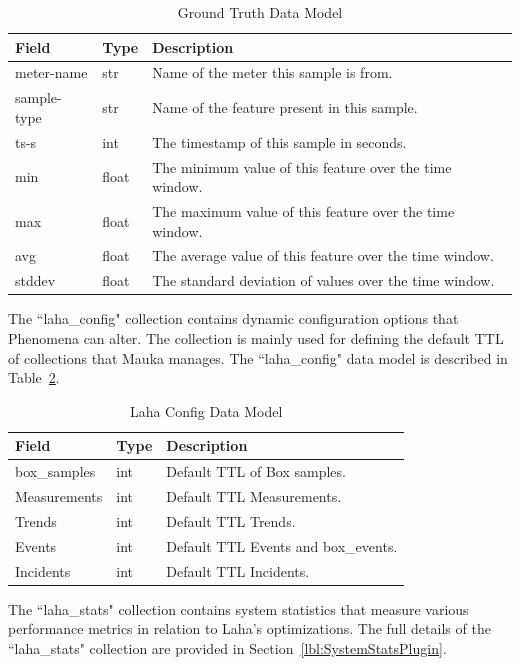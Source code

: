 \begin{table}[H]
	\centering
	\caption{Ground Truth Data Model}
	\begin{tabularx}{\textwidth}{llX}
		\toprule
		\textbf{Field} & \textbf{Type} & \textbf{Description} \\
		\midrule
		meter-name & str & Name of the meter this sample is from. \\
		sample-type & str & Name of the feature present in this sample. \\
		ts-s & int & The timestamp of this sample in seconds. \\
		min & float & The minimum value of this feature over the time window. \\
		max & float & The maximum value of this feature over the time window. \\
		avg & float & The average value of this feature over the time window. \\
		stddev & float & The standard deviation of values over the time window. \\
		\bottomrule
	\end{tabularx}
	\label{table:ground_truth}
\end{table}

The ``laha\_config" collection contains dynamic configuration options that Phenomena can alter. The collection is mainly used for defining the default TTL of collections that Mauka manages. The ``laha\_config" data model is described in Table~\ref{table:laha_config}.

\begin{table}[H]
	\centering
	\caption{Laha Config Data Model}
	\begin{tabularx}{\textwidth}{llX}
		\toprule
		\textbf{Field} & \textbf{Type} & \textbf{Description} \\
		\midrule
		box\_samples & int & Default TTL of Box samples. \\
		Measurements & int & Default TTL Measurements. \\
		Trends & int & Default TTL Trends. \\
		Events & int & Default TTL Events and box\_events. \\
		Incidents & int & Default TTL Incidents. \\
		\bottomrule
	\end{tabularx}
	\label{table:laha_config}
\end{table}

The ``laha\_stats" collection contains system statistics that measure various performance metrics in relation to Laha's optimizations. The full details of the ``laha\_stats" collection are provided in Section~\ref{lbl:SystemStatsPlugin}.

